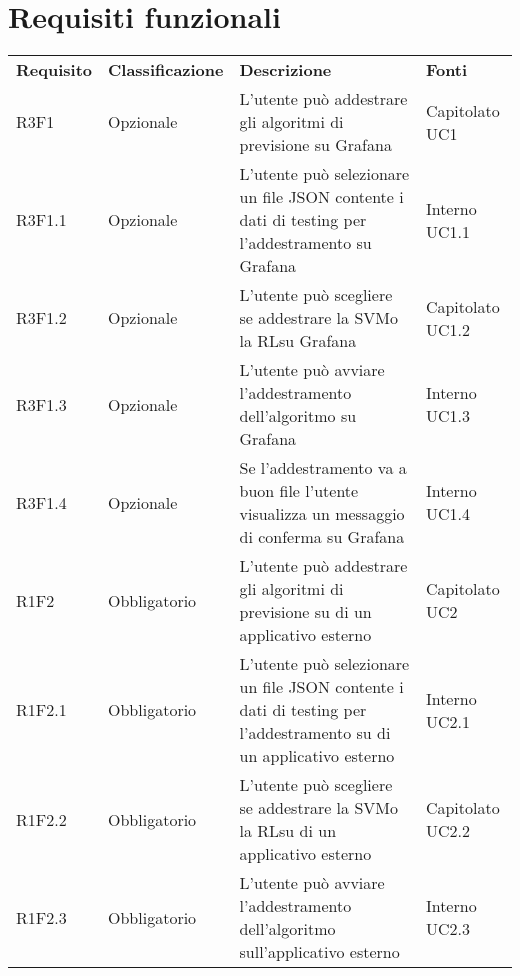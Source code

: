 \section{Requisiti funzionali}
\begin{longtable} {
		>{\centering}p{18mm} 
		>{\centering}p{28mm}
		>{}p{50mm} 
		>{}p{28mm}
	}

	\rowcolor{gray!50}

		\textbf{Requisito} & \textbf{Classificazione} & \textbf{Descrizione} & \textbf{Fonti} 	\TBstrut \\

		R3F1 & Opzionale & L'utente può addestrare gli algoritmi di previsione su Grafana\glo & Capitolato UC1 \TBstrut \\ [2mm]

		R3F1.1 & Opzionale & L'utente può selezionare un file JSON contente i dati di testing per l'addestramento su Grafana\glo & Interno UC1.1 \TBstrut \\ [2mm]

		R3F1.2 & Opzionale & L'utente può scegliere se addestrare la SVM\glosp o la RL\glosp su Grafana\glo & Capitolato UC1.2 \TBstrut \\ [2mm]

		R3F1.3 & Opzionale & L'utente può avviare l'addestramento dell'algoritmo su Grafana\glo & Interno UC1.3 \TBstrut \\ [2mm]

		R3F1.4 & Opzionale & Se l'addestramento va a buon file l'utente visualizza un messaggio di conferma su Grafana\glo & Interno UC1.4 \TBstrut \\ [2mm]

		R1F2 & Obbligatorio & L'utente può addestrare gli algoritmi di previsione su di un applicativo esterno & Capitolato UC2 \TBstrut \\ [2mm]

		R1F2.1 & Obbligatorio & L'utente può selezionare un file JSON contente i dati di testing per l'addestramento su di un applicativo esterno & Interno UC2.1 \TBstrut \\ [2mm]

		R1F2.2 & Obbligatorio & L'utente può scegliere se addestrare la SVM\glosp o la RL\glosp su di un applicativo esterno & Capitolato UC2.2 \TBstrut \\ [2mm]

		R1F2.3 & Obbligatorio & L'utente può avviare l'addestramento dell'algoritmo sull'applicativo esterno & Interno UC2.3 \TBstrut \\ [2mm]


\end{longtable}
